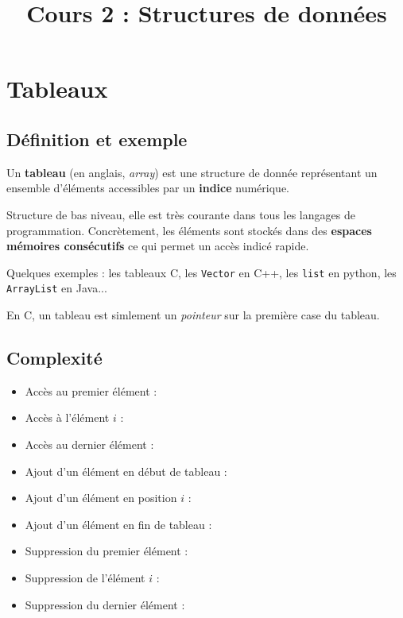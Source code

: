 \documentclass{../cours}
\title{Cours 2 : Structures de données}
\begin{document}
\maketitle
 
 
\section{Tableaux}

\subsection{Définition et exemple}

\begin{Definition}
Un \textbf{tableau} (en anglais, \emph{array}) est une structure de donnée représentant un ensemble d'éléments accessibles par un \textbf{indice} numérique.
\end{Definition}

Structure de bas niveau, elle est très courante dans tous les langages de programmation. Concrètement, les éléments sont stockés dans des \textbf{espaces mémoires consécutifs} ce qui permet un accès indicé rapide.

Quelques exemples : les tableaux C, les {\tt Vector} en C++, les {\tt list} en python, les {\tt ArrayList} en Java...

\begin{Example}
En C, un tableau est simlement un \emph{pointeur} sur la première case du tableau.


\end{Example}

\subsection{Complexité}

\begin{itemize}
\item Accès au premier élément : 
\item Accès à l'élément $i$ : 
\item Accès au dernier élément : 
\item Ajout d'un élément en début de tableau : 
\item Ajout d'un élément en position $i$ : 
\item Ajout d'un élément en fin de tableau : 
\item Suppression du premier élément : 
\item Suppression de l'élément $i$ : 
\item Suppression du dernier élément : 
\end{itemize}
\end{document}
